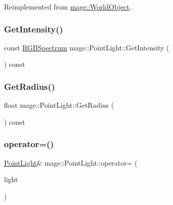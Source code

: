 Reimplemented from \hyperlink{classmage_1_1_world_object_a8793d22cb63b1bd31b1307e5e7094f61}{mage\+::\+World\+Object}.

\hypertarget{classmage_1_1_point_light_a301e1bdbe55fa34472f9f529c8c4539e}{}\label{classmage_1_1_point_light_a301e1bdbe55fa34472f9f529c8c4539e} 
\subsubsection{\texorpdfstring{Get\+Intensity()}{GetIntensity()}}
{\footnotesize\ttfamily const \hyperlink{structmage_1_1_r_g_b_spectrum}{R\+G\+B\+Spectrum} mage\+::\+Point\+Light\+::\+Get\+Intensity (\begin{DoxyParamCaption}{ }\end{DoxyParamCaption}) const}

\hypertarget{classmage_1_1_point_light_a6321441e96d79caaacf40056beb288f2}{}\label{classmage_1_1_point_light_a6321441e96d79caaacf40056beb288f2} 
\subsubsection{\texorpdfstring{Get\+Radius()}{GetRadius()}}
{\footnotesize\ttfamily float mage\+::\+Point\+Light\+::\+Get\+Radius (\begin{DoxyParamCaption}{ }\end{DoxyParamCaption}) const}

\hypertarget{classmage_1_1_point_light_adf04c5a558c2b1200ee98efed4b6603b}{}\label{classmage_1_1_point_light_adf04c5a558c2b1200ee98efed4b6603b} 
\subsubsection{\texorpdfstring{operator=()}{operator=()}\hspace{0.1cm}{\footnotesize\ttfamily [1/2]}}
{\footnotesize\ttfamily \hyperlink{classmage_1_1_point_light}{Point\+Light}\& mage\+::\+Point\+Light\+::operator= (\begin{DoxyParamCaption}\item[{const \hyperlink{classmage_1_1_point_light}{Point\+Light} \&}]{light }\end{DoxyParamCaption})\hspace{0.3cm}{\ttfamily [default]}}

